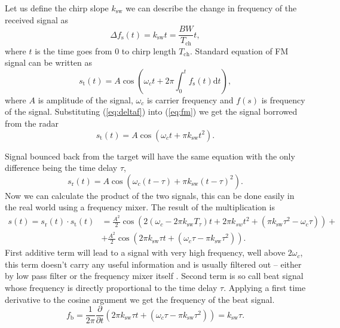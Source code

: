 Let us define the chirp slope $k_\mathrm{sw}$ we can describe the change in frequency of the received signal as
\begin{equation}
	\Delta f_\mathrm{s}(t) = k_\mathrm{sw}t = \frac{BW}{T_\mathrm{ch}} t,
	\label{eq:deltaf}
\end{equation}
where $t$ is the time goes from 0 to chirp length $T_\mathrm{ch}$.
Standard equation of FM signal can be written as
\begin{equation}
	s_\mathrm{t}(t) = A \cos\left(\omega_c t + 2\pi \int_{0}^{t} f_\mathrm{s}(t) \mathrm{d}t\right),
	\label{eq:fm}
\end{equation}
where $A$ is amplitude of the signal, $\omega_c$ is carrier frequency and $f(s)$ is frequency of the signal.
Substituting (\ref{eq:deltaf}) into (\ref{eq:fm}) we get the signal borrowed from the radar
\begin{equation}
	s_\mathrm{t}(t) = A \cos(\omega_c t + \pi k_\mathrm{sw}t^2).
	\label{eq:fm2}
\end{equation}

Signal bounced back from the target will have the same equation with the only difference being the time delay $\tau$,
\begin{equation}
	s_\mathrm{r}(t) = A \cos(\omega_c (t - \tau) + \pi k_\mathrm{sw}(t - \tau)^2).
	\label{eq:fm3}
\end{equation}
Now we can calculate the product of the two signals, this can be done easily in the real world using a frequency mixer.
The result of the multiplication is
\begin{align}
	s(t) = s_\mathrm{r}(t) \cdot  s_\mathrm{t}(t) &= \frac{A^2}{2}\cos\left(2(\omega_c - 2\pi k_\mathrm{sw}T_\tau)t + 2\pi k_{sw}t^2 + (\pi k_\mathrm{sw} \tau^2 - \omega_c \tau) \right)+ \nonumber \\
	&+\frac{A^2}{2} \cos\left(2\pi k_\mathrm{sw} \tau t + (\omega_c \tau - \pi k_\mathrm{sw} \tau^2)\right).
	\label{eq:fm4}
\end{align}
First additive term will lead to a signal with very high frequency, well above $2\omega_c$, this term doesn't carry any useful information and is usually filtered out -- either by low pass filter or the frequency mixer itself \cite{graham2005}.
Second term is so call beat signal whose frequency is directly proportional to the time delay $\tau$.
Applying a first time derivative to the cosine argument we get the frequency of the beat signal.
\begin{equation}
	f_\mathrm{b} = \frac{1}{2\pi}\frac{\partial}{\partial t} \left(2\pi k_\mathrm{sw} \tau t + (\omega_c \tau - \pi k_\mathrm{sw} \tau^2)\right) = k_\mathrm{sw} \tau.
	\label{eq:fb}
\end{equation}

